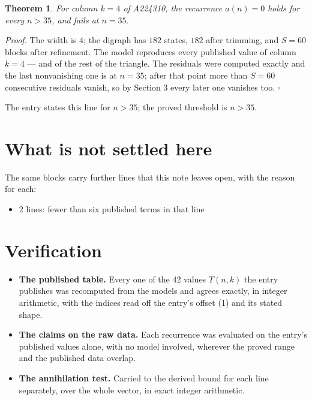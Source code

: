 \documentclass[11pt]{article}
\newtheorem{theorem}{Theorem}
\theoremstyle{definition}
\begin{document}
\begin{theorem} For column $k = 4$ of A224310, the recurrence $a(n) = 0$ holds for every $n > 35$, and fails at $n = 35$.\end{theorem}

{\itshape Proof.} The width is $4$; the digraph has $182$ states, $182$ after trimming, and $S = 60$ blocks after refinement. The model reproduces every published value of column $k = 4$ --- and of the rest of the triangle. The residuals were computed exactly and the last nonvanishing one is at $n = 35$; after that point more than $S = 60$ consecutive residuals vanish, so by Section 3 every later one vanishes too. $\square$

The entry states this line for $n > 35$; the proved threshold is $n > 35$.

\section{What is not settled here}

The same blocks carry further lines that this note leaves open, with the reason for each:

\begin{itemize}

\item 2 lines: fewer than six published terms in that line

\end{itemize}

\section{Verification}

\begin{itemize}

\item {\bfseries The published table.} Every one of the 42 values $T(n,k)$ the entry publishes was recomputed from the models and agrees exactly, in integer arithmetic, with the indices read off the entry's offset (1) and its stated shape.

\item {\bfseries The claims on the raw data.} Each recurrence was evaluated on the entry's published values alone, with no model involved, wherever the proved range and the published data overlap.

\item {\bfseries The annihilation test.} Carried to the derived bound for each line separately, over the whole vector, in exact integer arithmetic.

\end{itemize}
\end{document}

